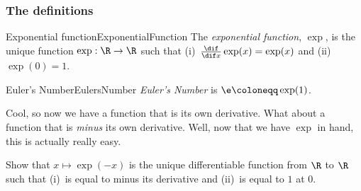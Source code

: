 \subsubsection{The definitions}

\begin{dfn}{Exponential function}{ExponentialFunction}
The \emph{exponential function}, $\exp$\index[notation]{$\exp$}, is the unique function $\exp :\R \rightarrow \R$ such that (i)~$\frac{\dif}{\dif x}\exp (x)=\exp (x)$ and (ii)~$\exp (0)=1$.
\end{dfn}
\begin{dfn}{Euler's Number}{EulersNumber}
\emph{Euler's Number} is $\e \coloneqq \exp (1)$\index[notation]{$\e$}.
\end{dfn}

Cool, so now we have a function that is its own derivative.  What about a function that is \emph{minus} its own derivative.  Well, now that we have $\exp$ in hand, this is actually really easy.
\begin{exr}{}{}
Show that $x\mapsto \exp (-x)$ is the unique differentiable function from $\R$ to $\R$ such that (i)~is equal to minus its derivative and (ii)~is equal to $1$ at $0$.
\end{exr}

